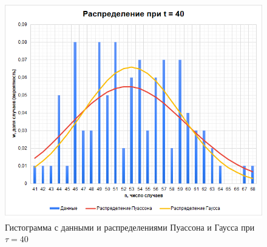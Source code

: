 \documentclass[a4paper]{article}
\begin{document}
\begin{figure}[t]
    \centering
    \includegraphics[width=1\textwidth]{t40}
    \caption{Гистограмма с данными и распределениями Пуассона и Гаусса при $\tau = 40$}
\end{figure}
\end{document}
